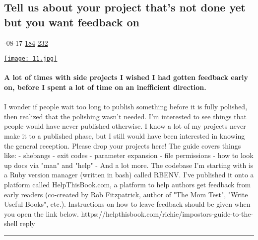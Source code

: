 \documentclass[10pt,a4paper]{article}
\begin{document}
\begin{multicols}{2}

\noindent\begin{minipage}{\linewidth}
\subsection{Tell us about your project that's not done yet but you want feedback on}
\textsc{\footnotesize
{\scriptsize\faCalendar}-08-17 
{\scriptsize\faThumbsOUp}\space 
\href{http://news.ycombinator.com/item?id=37138807\&utm\_term=comment}{184} 
{\scriptsize\faComments}\space 
\href{http://news.ycombinator.com/item?id=37138807\&utm\_term=comment}{232} 
}
\par\medskip\noindent
\href{https://news.ycombinator.com/item?id=37156101\&utm\_source=hackernewsletter\&utm\_medium=email\&utm\_term=ask\_hn}{
    \texttt{[image: 11.jpg]}
}
\end{minipage}
\paragraph{}
\textbf{A lot of times with side projects I wished I had gotten feedback early on, before I spent a lot of time on an inefficient direction.}
\paragraph{}
 I wonder if people wait too long to publish something before it is fully polished, then realized that the polishing wasn't needed.
I'm interested to see things that people would have never published otherwise. I know a lot of my projects never make it to a published phase, but I still would have been interested in knowing the general reception. Please drop your projects here!
The guide covers things like:
- shebangs
- exit codes
- parameter expansion
- file permissions
- how to look up docs via "man" and "help"
- And a lot more.
The codebase I'm starting with is a Ruby version manager (written in bash) called RBENV. I've published it onto a platform called HelpThisBook.com, a platform to help authors get feedback from early readers (co-created by Rob Fitzpatrick, author of "The Mom Test", "Write Useful Books", etc.). Instructions on how to leave feedback should be given when you open the link below.
https://helpthisbook.com/richie/impostors-guide-to-the-shell
reply
\par\noindent\textcolor{red}{\rule{\linewidth}{0.2mm}}
\vfill
\null
\noindent\begin{minipage}{\linewidth}

\end{minipage}
\end{multicols}
\end{document}
